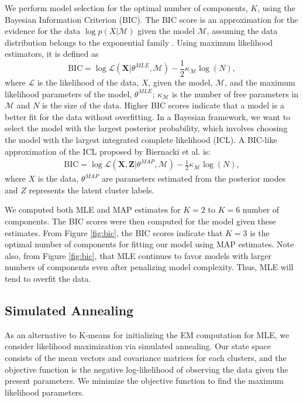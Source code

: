 \documentclass[twoside]{article}
\theoremstyle{theorem}
\theoremstyle{theorem}
\theoremstyle{theorem}
\theoremstyle{lemma}
\theoremstyle{definition}
\theoremstyle{example}
\begin{document}
We perform model selection for the optimal number of components, $K$, using the Bayesian Information Criterion (BIC). The BIC score is an approximation for the evidence for the data $\log p(X | \mathcal{M})$ given the model $\mathcal{M}$, assuming the data distribution belongs to the exponential family \cite{Bishop}. Using maximum likelihood estimators, it is defined as 
\begin{equation}
\mathrm{BIC} = \log\mathcal{L}(\mathbf{X} | \theta^{MLE}, \mathcal{M}) - \frac{1}{2} \kappa_\mathcal{M}  \log(N),
\end{equation}
where $\mathcal{L}$ is the likelihood of the data, $X$, given the model, $\mathcal{M}$, and the maximum likelihood parameters of the model, $\theta^{MLE}$; $\kappa_\mathcal{M}$ is the number of free parameters in $\mathcal{M}$ and $N$ is the size of the data. Higher BIC scores indicate that a model is a better fit for the data without overfitting. In a Bayesian framework, we want to select the model with the largest posterior probability, which involves choosing the model with the largest integrated complete likelihood (ICL). A BIC-like approximation of the ICL proposed by Biernacki et al. \cite{Biernacki} is: 
\begin{align}
\mathrm{BIC} = \log \mathcal{L}(\mathbf{X}, \mathbf{Z} | \theta^{MAP},  \mathcal{M}) -  \frac{1}{2} \kappa_\mathcal{M} \log(N),
\end{align}
where $X$ is the data, $\theta^{MAP}$ are parameters estimated from the posterior modes and $Z$ represents the latent cluster labels. 

We computed both MLE and MAP estimates for $K=2$ to $K=6$ number of components. The BIC scores were then computed for the model given these estimates. From Figure \ref{fig:bic}, the BIC scores indicate that $K = 3$ is the optimal number of components for fitting our model using MAP estimates. Note also, from Figure \ref{fig:bic}, that MLE continues to favor models with larger numbers of components even after penalizing model complexity. Thus, MLE will tend to overfit the data.

\subsection{Simulated Annealing}
As an alternative to K-means for initializing the EM computation for MLE, we consider likelihood maximization via simulated annealing.  Our state space consists of the mean vectors and covariance matrices for each clusters, and the objective function is the negative log-likelihood of observing the data given the present parameters. We minimize the objective function to find the maximum likelihood parameters.
\end{document}
